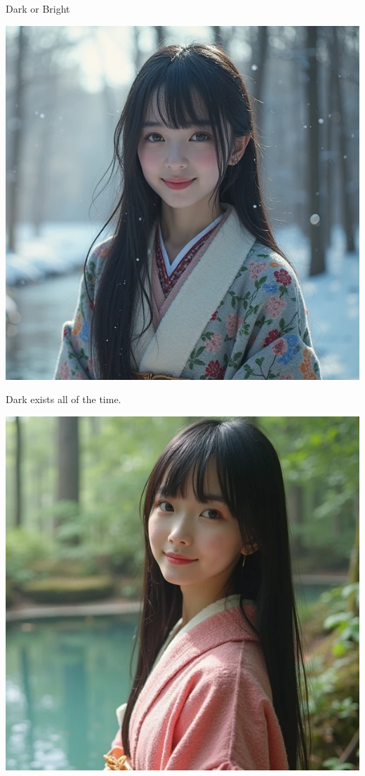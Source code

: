 \documentclass{beamer}
\begin{document}
\begin{frame}{Dark or Bright}
\begin{minipage}{0.45\textwidth}
\begin{center}
\includegraphics[width=\textwidth]{dark.png}
\end{center}
\begin{center}
Dark exists all of the time.
\end{center}
\end{minipage}
\hfill
\begin{minipage}{0.45\textwidth}
\begin{center}
\includegraphics[width=\textwidth]{bright.png}

\end{center}
\end{minipage}
\end{frame}
\end{document}
